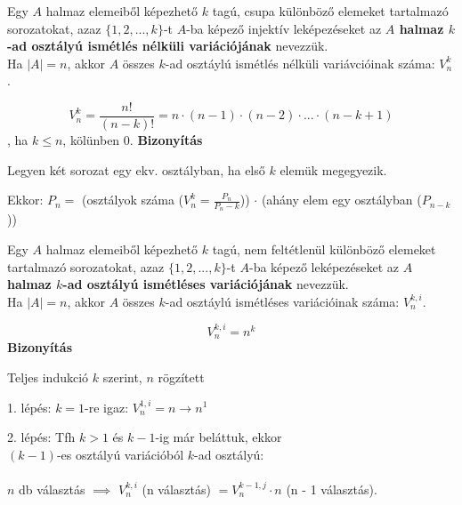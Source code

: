 \begin{frame}
  \begin{tcolorbox}[title={Def.:Ismétlés nélküli variáció}]
    Egy $A$ halmaz elemeiből képezhető $k$ tagú, csupa különböző elemeket tartalmazó sorozatokat, azaz $\{ 1, 2, ..., k \}$-t $A$-ba képező injektív leképezéseket az \textbf{$A$ halmaz  $k$-ad osztályú ismétlés nélküli variációjának} nevezzük.\\
    Ha $|A| = n$, akkor $A$ összes $k$-ad osztáylú ismétlés nélküli variávcióinak száma: $V_n^k$.
  \end{tcolorbox}

  \begin{tcolorbox}[title={Tétel: Variációk száma}]
    $$V_n^k = \frac{n!}{(n - k)!} = n \cdot (n - 1) \cdot (n - 2) \cdot ... \cdot (n - k + 1)$$, ha $k \leq n$, kölünben 0.
  \tcblower
    \textbf{Bizonyítás}
    \mmedskip
    
    Legyen két sorozat egy ekv. osztályban, ha első $k$ elemük megegyezik.\\
    \msmallskip
    
    Ekkor: $P_n = $ (osztályok száma ($V_n^k = \frac{P_n}{P_n - k}$)) $\cdot$ (ahány elem egy osztályban ($P_{n - k}$))
  \end{tcolorbox}
\end{frame}

\begin{frame}
  \begin{tcolorbox}[title={Def.: Ismétléses Variáció}]
    Egy $A$ halmaz elemeiből képezhető $k$ tagú, nem feltétlenül különböző elemeket tartalmazó sorozatokat, azaz $\{ 1, 2, ..., k \}$-t $A$-ba képező leképezéseket az \textbf{$A$ halmaz  $k$-ad osztályú ismétléses variációjának} nevezzük.\\
    Ha $|A| = n$, akkor $A$ összes $k$-ad osztáylú ismétléses variációinak száma: $V_n^{k, i}$.
  \end{tcolorbox}

  \begin{tcolorbox}[title={Tétel: Ismétléses variációk száma}]
    $$V_n^{k, i} = n^k$$
  \tcblower
    \textbf{Bizonyítás}\\
    \mmedskip

    Teljes indukció $k$ szerint, $n$ rögzített\\
    \msmallskip
    
    1. lépés: $k = 1$-re igaz: $V_n^{1, i} = n \rightarrow n^1$\\
    \msmallskip
    
    2. lépés: Tfh $k > 1$ és $k - 1$-ig már beláttuk, ekkor\\
    $(k - 1)$-es osztályú variációból $k$-ad osztályú:\\
    \msmallskip\\
    
    $n$ db választás $\implies$ $V_n^{k, i}$ (n választás) $= V_n^{k - 1, j} \cdot n$ (n - 1 választás).
  \end{tcolorbox}
\end{frame}

